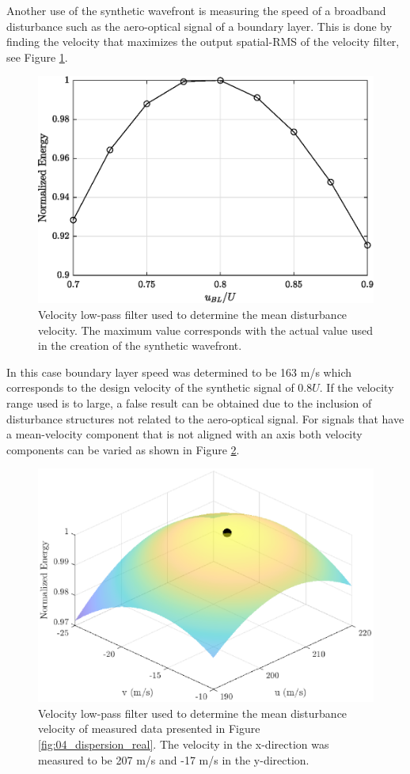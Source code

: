Another use of the synthetic wavefront is measuring the speed of a broadband disturbance such as the aero-optical signal of a boundary layer.
This is done by finding the velocity that maximizes the output spatial-RMS of the velocity filter, see Figure \ref{fig:04_filter_velocity_measure}.
\begin{figure}
 \centering
 \includegraphics{../matlab/04_basic_filtering/filter_velocity_measure.eps}
 \caption{Velocity low-pass filter used to determine the mean disturbance velocity.  The maximum value corresponds with the actual value used in the creation of the synthetic wavefront.}
 \label{fig:04_filter_velocity_measure}
\end{figure}
In this case boundary layer speed was determined to be 163 m/s which corresponds to the design velocity of the synthetic signal of $0.8U$.
If the velocity range used is to large, a false result can be obtained due to the inclusion of disturbance structures not related to the aero-optical signal.
For signals that have a mean-velocity component that is not aligned with an axis both velocity components can be varied as shown in Figure \ref{fig:04_filter_velocity_real}.
\begin{figure}
 \centering
 \includegraphics{../matlab/04_basic_filtering/filter_velocity_real.eps}
 \caption{Velocity low-pass filter used to determine the mean disturbance velocity of measured data presented in Figure \ref{fig:04_dispersion_real}.  The velocity in the x-direction was measured to be 207 m/s and -17 m/s in the y-direction.}
 \label{fig:04_filter_velocity_real}
\end{figure}

